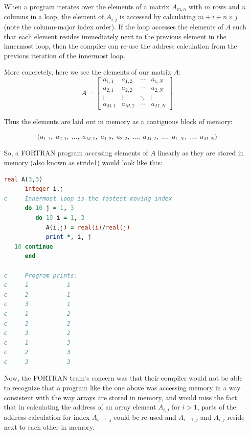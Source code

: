 When a program iterates over the elements of a matrix $A_{m, n}$ with $m$ rows and $n$ columns in a loop,
the element of $A_{i, j}$ is accessed by calculating $m + i + n \times j$ (note the column-major index order).
If the loop accesses the elements of $A$ such that each element resides immediately next to the previous
element in the innermost loop, then the compiler can re-use the address calculation from the previous
iteration of the innermost loop.

More concretely, here we see the elements of our matrix $A$:
\[
	A =
	\begin{bmatrix}
		a_{1,1} & a_{1,2} & \cdots & a_{1,N} \\
		a_{2,1} & a_{2,2} & \cdots & a_{2,N} \\
		\vdots  & \vdots  & \ddots & \vdots  \\
		a_{M,1} & a_{M,2} & \cdots & a_{M,N}
	\end{bmatrix}
\]

Thus the elements are laid out in memory as a contiguous block of memory:

\[
	\big(
	a_{1,1},\; a_{2,1},\; \dots,\; a_{M,1},\;
	a_{1,2},\; a_{2,2},\; \dots,\; a_{M,2},\;
	\ldots,\;
	a_{1,N},\; \dots,\; a_{M,N}
	\big)
\]

So, a FORTRAN program accessing elements of $A$ linearly as they
are stored in memory (also known as \gls{stride1})
\href{https://godbolt.org/z/T6M4dvMP4}{would look like this:}

\begin{lstlisting}[language=Fortran,frame=single]
      real A(3,3)
      integer i,j
c     Innermost loop is the fastest-moving index
      do 10 j = 1, 3
         do 10 i = 1, 3
            A(i,j) = real(i)/real(j)
            print *, i, j
   10 continue
      end

c     Program prints:
c     1           1
c     2           1
c     3           1
c     1           2
c     2           2
c     3           2
c     1           3
c     2           3
c     3           3
\end{lstlisting}

Now, the FORTRAN team's concern was that their compiler would not be able to recognize
that a program like the one above was accessing memory in a way consistent with the
way arrays are stored in memory, and would miss the fact that in calculating
the address of an array element $A_{i,j}$ for $i > 1$, parts of the address calculation
for index $A_{i-1, j}$ could be re-used and $A_{i-1, j}$ and $A_{i, j}$ reside
next to each other in memory.

